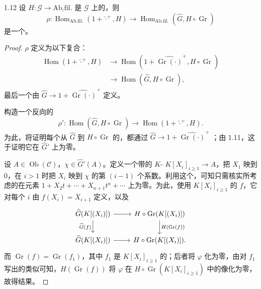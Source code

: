 \begin{SGAresult}{}{1.12}
设 $H:\mathscr G\longrightarrow\underline{\mathrm{Ab.fil.}}$ 是 $\mathscr G$ 上的，则
\[
\rho:\operatorname{Hom}_{\mathrm{Ab.fil.}}(1+\widehat{\cdot}^{+},H)
\longrightarrow
\operatorname{Hom}_{\mathrm{Ab.fil.}}(\widehat G,H\circ\operatorname{Gr})
\]
是一个。
\end{SGAresult}
\begin{proof}
 $\rho$ 定义为以下复合：
\[
\begin{aligned}
\operatorname{Hom}(1+\widehat{\cdot}^{+},H)
&\longrightarrow
\operatorname{Hom}(1+\widehat{\operatorname{Gr}(\cdot)}^{+},H\circ\operatorname{Gr})\\
&\longrightarrow\operatorname{Hom}(\widehat G,H\circ\operatorname{Gr}),
\end{aligned}
\]
最后一个由 $\widehat G\longrightarrow1+\widehat{\operatorname{Gr}(\cdot)}^{+}$ 定义。

构造一个反向的
\[
\rho':\operatorname{Hom}(\widehat G,H\circ\operatorname{Gr})
\longrightarrow\operatorname{Hom}(1+\widehat{\cdot}^{+},H).
\]
为此，将证明每个从 $\widehat G$ 到 $H\circ\operatorname{Gr}$ 的，都通过 $\widehat G\longrightarrow1+\widehat{\operatorname{Gr}(\cdot)}^{+}$ ；由 1.11，这于证明它在 $\widehat G'$ 上为零。

设 $A\in\operatorname{Ob}(\mathscr C)$，$\chi\in\widehat G'(A)$。定义一个带的 $K$-
$K[X_i]_{i\geqslant1}\longrightarrow A$，把 $X_1$ 映到 $0$，在 $i>1$ 时把 $X_i$ 映到 $\chi$ 的第 $(i-1)$ 个系数。利用这个，可知只需核实所考虑的在元素 $1+X_2t+\cdots+X_{n+1}t^n+\cdots$ 上为零。为此，使用 $K[X_i]_{i\geqslant1}$ 的 $f$，它对每个 $i$ 由 $f(X_i)=X_{i+1}$ 定义，以及
\[
\begin{tikzcd}
\widehat G(K[(X_i)])\arrow[r]\arrow[d,"\widehat G(f)"'] &
H\circ\operatorname{Gr}(K[(X_i)])\arrow[d,"H(\operatorname{Gr}(f))"]\\
\widehat G(K[(X_i)])\arrow[r] & H\circ\operatorname{Gr}(K[(X_i)]).
\end{tikzcd}
\]
而 $\operatorname{Gr}(f)=\operatorname{Gr}(f_1)$，其中 $f_1$ 是 $K[X_i]_{i\geqslant1}$ 的；后者将 $\varphi$ 化为零，由对 $f_1$ 写出的类似可知，$H(\operatorname{Gr}(f))$ 将 $\varphi$ 在 $H\circ\operatorname{Gr}(K[X_i]_{i\geqslant1})$ 中的像化为零，故得结果。


\end{proof}
